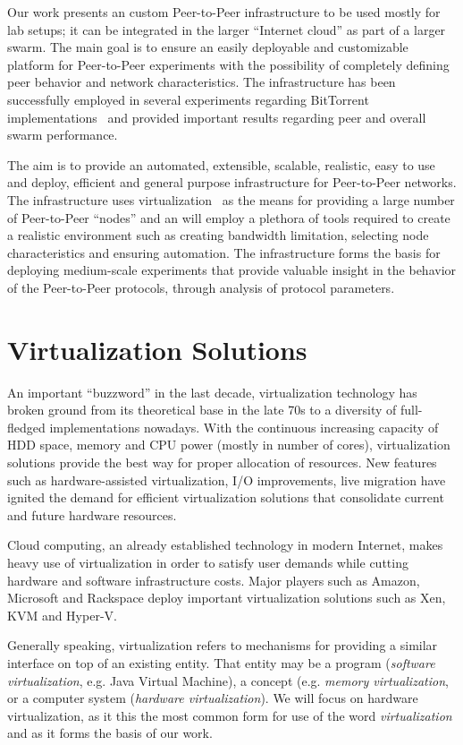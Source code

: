 Our work presents an custom Peer-to-Peer infrastructure to be used mostly for
lab setups; it can be integrated in the larger ``Internet cloud'' as part of a
larger swarm. The main goal is to ensure an easily deployable and customizable
platform for Peer-to-Peer experiments with the possibility of completely
defining peer behavior and network characteristics. The infrastructure has
been successfully employed in several experiments regarding BitTorrent
implementations~\cite{bt-pef} and provided important results regarding peer and overall
swarm performance.

The aim is to provide an automated, extensible, scalable, realistic, easy to
use and deploy, efficient and general purpose infrastructure for Peer-to-Peer
networks. The infrastructure uses virtualization~\cite{p2p-va} as the means for
providing a large number of Peer-to-Peer ``nodes'' and an will employ a
plethora of tools required to create a realistic environment such as creating
bandwidth limitation, selecting node characteristics and ensuring automation.
The infrastructure forms the basis for deploying medium-scale experiments that
provide valuable insight in the behavior of the Peer-to-Peer protocols,
through analysis of protocol parameters.

\section{Virtualization Solutions}
\label{sec:virt-infra:openvz}

An important ``buzzword'' in the last decade, virtualization technology has
broken ground from its theoretical base in the late 70s to a diversity of
full-fledged implementations nowadays. With the continuous increasing capacity
of HDD space, memory and CPU power (mostly in number of cores), virtualization
solutions provide the best way for proper allocation of resources. New
features such as hardware-assisted virtualization, I/O improvements, live
migration have ignited the demand for efficient virtualization solutions that
consolidate current and future hardware resources.

Cloud computing, an already established technology in modern Internet, makes
heavy use of virtualization in order to satisfy user demands while cutting
hardware and software infrastructure costs. Major players such as Amazon,
Microsoft and Rackspace deploy important virtualization solutions such as Xen,
KVM and Hyper-V.

Generally speaking, virtualization refers to mechanisms for providing a
similar interface on top of an existing entity. That entity may be a program
(\textit{software virtualization}, e.g. {Java Virtual Machine}),
a concept (e.g. \textit{memory virtualization}, or a computer system
(\textit{hardware virtualization}). We will focus on hardware virtualization,
as it this the most common form for use of the word \textit{virtualization}
and as it forms the basis of our work.

